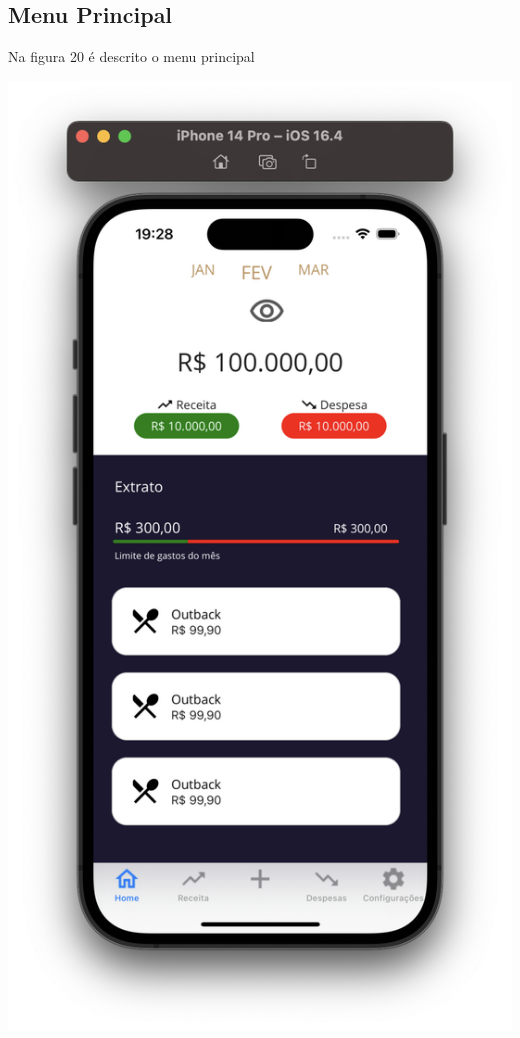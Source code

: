 \subsection{Menu Principal}

Na figura 20 é descrito o menu principal

    \vspace{\baselineskip}
    \begin{center}
        \begin{minipage}{\textwidth}
            \centering
            \includegraphics[scale=0.2]{figs/fig20.png}
            \label{fig:figura20}
        \end{minipage}
    \end{center}  

